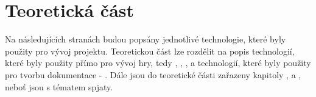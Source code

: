 \documentclass[main.tex]{subfiles}
\begin{document}
\section{Teoretická část} 
Na následujících stranách budou popsány jednotlivé technologie, které byly použity pro vývoj projektu. Teoretickou část lze rozdělit na popis technologií, které byly použity přímo pro vývoj hry, tedy , , , a technologií, které byly použity pro tvorbu dokumentace -  . Dále jsou do teoretické části zařazeny kapitoly ,  a , neboť jsou s tématem spjaty. 
\end{document}
